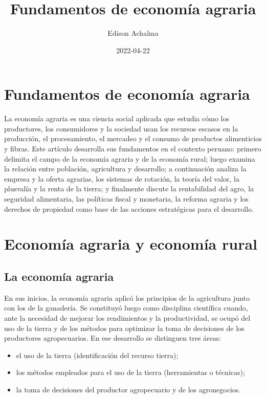 \documentclass[
  man,
  floatsintext,
  longtable,
  a4paper,
  nolmodern,
  notxfonts,
  notimes,
  12pt,
  colorlinks=true,linkcolor=blue,citecolor=blue,urlcolor=blue]{apa7}
\title{Fundamentos de economía agraria}
\author{Edison Achalma}
\affiliation{
{Escuela Profesional de Economía, Universidad Nacional de San Cristóbal
de Huamanga}}
\date{2022-04-22}
\providecommand{\tightlist}{%
  \setlength{\itemsep}{0pt}\setlength{\parskip}{0pt}}
\begin{document}
\maketitle


\hypertarget{toc}{}
\tableofcontents
\newpage
\section[Introduction]{Fundamentos de economía agraria}

\setcounter{secnumdepth}{3}

\setlength\LTleft{0pt}




La economía agraria es una ciencia social aplicada que estudia cómo los
productores, los consumidores y la sociedad usan los recursos escasos en
la producción, el procesamiento, el mercadeo y el consumo de productos
alimenticios y fibras. Este artículo desarrolla sus fundamentos en el
contexto peruano: primero delimita el campo de la economía agraria y de
la economía rural; luego examina la relación entre población,
agricultura y desarrollo; a continuación analiza la empresa y la oferta
agrarias, los sistemas de rotación, la teoría del valor, la plusvalía y
la renta de la tierra; y finalmente discute la rentabilidad del agro, la
seguridad alimentaria, las políticas fiscal y monetaria, la reforma
agraria y los derechos de propiedad como base de las acciones
estratégicas para el desarrollo.

\section{Economía agraria y economía
rural}\label{economuxeda-agraria-y-economuxeda-rural}

\subsection{La economía agraria}\label{la-economuxeda-agraria}

En sus inicios, la economía agraria aplicó los principios de la
agricultura junto con los de la ganadería. Se constituyó luego como
disciplina científica cuando, ante la necesidad de mejorar los
rendimientos y la productividad, se ocupó del uso de la tierra y de los
métodos para optimizar la toma de decisiones de los productores
agropecuarios. En ese desarrollo se distinguen tres áreas:

\begin{itemize}
\tightlist
\item
  el uso de la tierra (identificación del recurso tierra);
\item
  los métodos empleados para el uso de la tierra (herramientas o
  técnicas);
\item
  la toma de decisiones del productor agropecuario y de los
  agronegocios.
\end{itemize}
\end{document}
